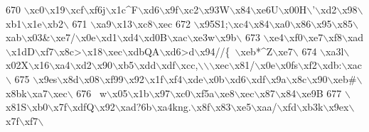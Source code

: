 \begin{DoxyCode}
{670 \textcolor{stringliteral}{\(\backslash\)xc0\(\backslash\)x19\(\backslash\)xcf\(\backslash\)xf6j\(\backslash\)x1c^F\(\backslash\)xd6\(\backslash\)x9f\(\backslash\)xc2\(\backslash\)x93W\(\backslash\)x84\(\backslash\)xe6U\(\backslash\)x00H\(\backslash\)'\(\backslash\)xd2\(\backslash\)x98\(\backslash\)xb1\(\backslash\)x1e\(\backslash\)xb2\(\backslash\)}
671 \textcolor{stringliteral}{\(\backslash\)xa9\(\backslash\)x13\(\backslash\)xc8\(\backslash\)xec%
672 \textcolor{stringliteral}{\(\backslash\)x95S1;\(\backslash\)xc4\(\backslash\)x84\(\backslash\)xa0\(\backslash\)x86\(\backslash\)x95\(\backslash\)x85\(\backslash\)xab\(\backslash\)x03&\(\backslash\)xe7/\(\backslash\)x0e\(\backslash\)xd1\(\backslash\)xd4\(\backslash\)xd0B\(\backslash\)xac\(\backslash\)xe3w\(\backslash\)x9b\(\backslash\)}
673 \textcolor{stringliteral}{\(\backslash\)xe4\(\backslash\)xf0\(\backslash\)xe7\(\backslash\)xf8\(\backslash\)xad\(\backslash\)x1dD\(\backslash\)xf7\(\backslash\)x8c>\(\backslash\)x18\(\backslash\)xec\(\backslash\)xdbQA\(\backslash\)xd6>d\(\backslash\)x94//\{~\(\backslash\)xeb*^Z\(\backslash\)xe7\(\backslash\)}
674 \textcolor{stringliteral}{\(\backslash\)xa3l\(\backslash\)x02X\(\backslash\)x16\(\backslash\)xa4\(\backslash\)xd2\(\backslash\)x90\(\backslash\)xb5\(\backslash\)xdd\(\backslash\)xdf\(\backslash\)xcc,\(\backslash\)\(\backslash\)\(\backslash\)xec\(\backslash\)x81/\(\backslash\)x0e\(\backslash\)x0fs\(\backslash\)xf2\(\backslash\)xdb:\(\backslash\)xac\(\backslash\)}
675 \textcolor{stringliteral}{\(\backslash\)x9es\(\backslash\)x8d\(\backslash\)x08\(\backslash\)xf99\(\backslash\)x92\(\backslash\)x1f\(\backslash\)xf4\(\backslash\)xde\(\backslash\)x0b\(\backslash\)xd6\(\backslash\)xdf\(\backslash\)x9a\(\backslash\)x8c\(\backslash\)x90\(\backslash\)xeb#\(\backslash\)x8bk\(\backslash\)xa7\(\backslash\)xec\(\backslash\)}
676 \textcolor{stringliteral}{~w\(\backslash\)x05\(\backslash\)x1b\(\backslash\)x97\(\backslash\)xc0\(\backslash\)xf5a\(\backslash\)xe8\(\backslash\)xec\(\backslash\)x87\(\backslash\)x84\(\backslash\)xe9B%
677 \textcolor{stringliteral}{\(\backslash\)x81S\(\backslash\)xb0\(\backslash\)x7f\(\backslash\)xdfQ\(\backslash\)x92\(\backslash\)xad?6b\(\backslash\)xa4kng.\(\backslash\)x8f\(\backslash\)x83\(\backslash\)xe5\(\backslash\)xaa/\(\backslash\)xfd\(\backslash\)xb3k\(\backslash\)x9ex\(\backslash\)x7f\(\backslash\)xf7\(\backslash\)}
}}}
\end{DoxyCode}
